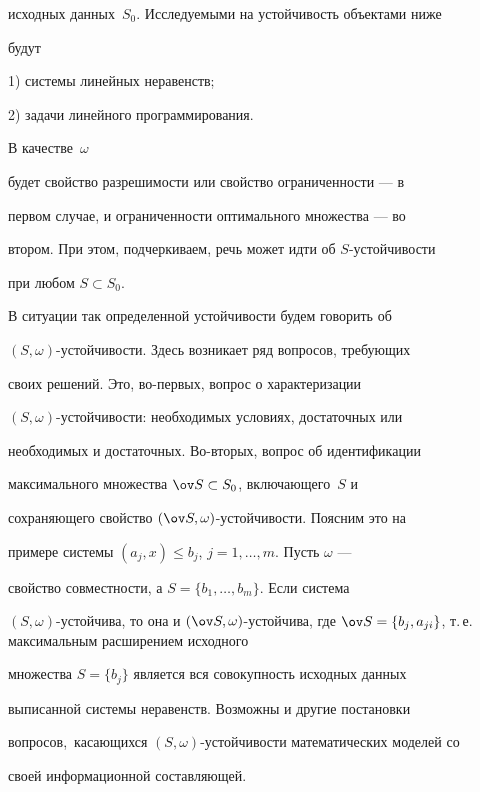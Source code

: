 исходных данных~$S_0$. Исследуемыми на устойчивость объектами ниже


будут





1) системы линейных неравенств;


2) задачи линейного программирования.





В качестве~$\omega$


будет свойство разрешимости или свойство ограниченности --- в


первом случае, и ограниченности оптимального множества --- во


втором. При этом, подчеркиваем, речь может идти об $S$-устойчивости


при любом $S\subset S_0$.





В ситуации так определенной устойчивости будем говорить об


$(S,\omega)$-устойчивости. Здесь возникает ряд вопросов, требующих


своих решений. Это, во-первых, вопрос о характеризации


$(S,\omega)$-устойчивости: необходимых условиях, достаточных или


необходимых и достаточных. Во-вторых, вопрос об идентификации


максимального множества $\ov S\subset S_0$, включающего~$S$ и


сохраняющего свойство $(\ov S,\omega)$-устойчивости. Поясним это на


примере системы $(a_j,x)\leq b_j$, $j=1,\dotsc,m$. Пусть $\omega$ ---


свойство совместности, а $S=\{b_1,\dotsc,b_m\}$. Если система


$(S,\omega)$-устойчива, то она и $(\ov S,\omega)$-устойчива, где $\ov


S=\{b_j, a_{ji}\}$, т.\,е. максимальным расширением исходного


множества $S=\{b_j\}$ является вся совокупность исходных данных


выписанной системы неравенств. Возможны и другие постановки


вопросов,\ касающихся $(S,\omega)$-устойчивости математических моделей со


своей информационной составляющей.






